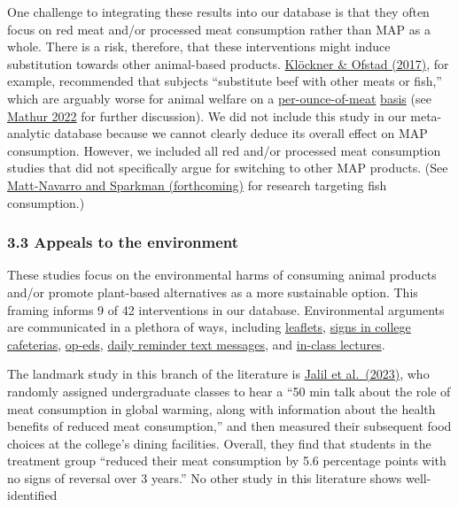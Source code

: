 \documentclass[
  letterpaper,
  DIV=11,
  numbers=noendperiod]{scrartcl}
\begin{document}
One challenge to integrating these results into our database is that
they often focus on red meat and/or processed meat consumption rather
than MAP as a whole. There is a risk, therefore, that these
interventions might induce substitution towards other animal-based
products. \href{https://doi.org/10.1016/j.jenvp.2017.01.006}{Klöckner \&
Ofstad (2017)}, for example, recommended that subjects ``substitute beef
with other meats or fish,'' which are arguably worse for animal welfare
on a
\href{https://slatestarcodex.com/2015/09/23/vegetarianism-for-meat-eaters/}{per-ounce-of-meat}
\href{https://www.vox.com/future-perfect/22430749/beef-chicken-climate-diet-vegetarian}{basis}
(see \href{https://www.science.org/doi/10.1126/science.abo2535}{Mathur
2022} for further discussion). We did not include this study in our
meta-analytic database because we cannot clearly deduce its overall
effect on MAP consumption. However, we included all red and/or processed
meat consumption studies that did not specifically argue for switching
to other MAP products. (See
\href{https://static1.squarespace.com/static/5e90e46fd1119766887d1dc3/t/646cc4f6d0b87674aa83a548/1684849910918/FishNormsInterventionBrief.pdf}{Matt-Navarro
and Sparkman (forthcoming)} for research targeting fish consumption.)

\hypertarget{appeals-to-the-environment}{%
\subsubsection{3.3 Appeals to the
environment}\label{appeals-to-the-environment}}

These studies focus on the environmental harms of consuming animal
products and/or promote plant-based alternatives as a more sustainable
option. This framing informs 9 of 42 interventions in our database.
Environmental arguments are communicated in a plethora of ways,
including
\href{https://core.ac.uk/download/pdf/158315429.pdf}{leaflets},
\href{https://doi.org/10.1016/j.appet.2020.104842}{signs in college
cafeterias}, \href{https://doi.org/10.1016/j.jenvp.2021.101592}{op-eds},
\href{https://doi.org/10.1016/j.jenvp.2021.101592}{daily reminder text
messages}, and
\href{https://assets.researchsquare.com/files/rs-2047134/v1_covered.pdf?c=1665164513}{in-class
lectures}.

The landmark study in this branch of the literature is
\href{https://doi.org/10.1038/s43016-023-00712-1}{Jalil et al.~(2023)},
who randomly assigned undergraduate classes to hear a ``50 min talk
about the role of meat consumption in global warming, along with
information about the health benefits of reduced meat consumption,'' and
then measured their subsequent food choices at the college's dining
facilities. Overall, they find that students in the treatment group
``reduced their meat consumption by 5.6 percentage points with no signs
of reversal over 3 years.'' No other study in this literature shows
well-identified
\end{document}

